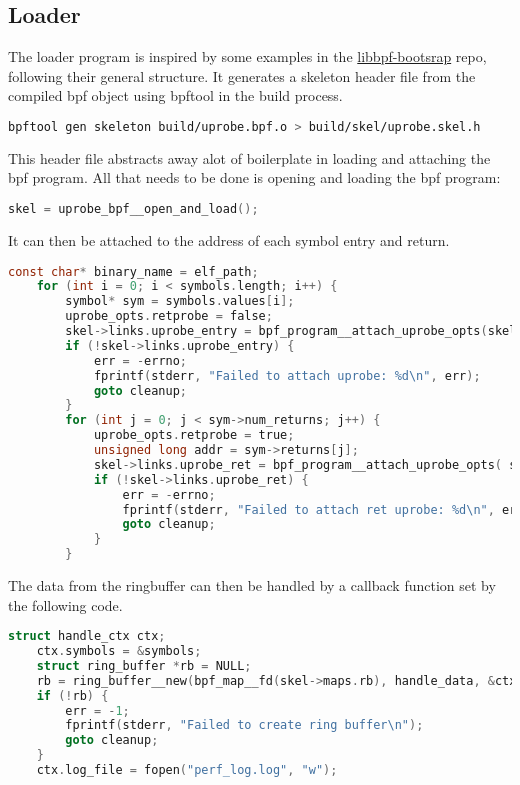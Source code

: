 \documentclass[a4paper, 12pt, english]{article}
\begin{document}
\subsection{Loader}
The loader program is inspired by some examples in the \href{https://github.com/libbpf/libbpf-bootstrap}{libbpf-bootsrap} repo, following their general structure.
It generates a skeleton header file from the compiled bpf object using bpftool in the build process.
\begin{lstlisting}[language=sh, basicstyle=\ttfamily, frame=single]
bpftool gen skeleton build/uprobe.bpf.o > build/skel/uprobe.skel.h
\end{lstlisting}

This header file abstracts away alot of boilerplate in loading and attaching the bpf program. All that needs to be done is opening and loading the bpf program:
\begin{lstlisting}[language=C, basicstyle=\ttfamily, frame=single]
    skel = uprobe_bpf__open_and_load();
\end{lstlisting}

It can then be attached to the address of each symbol entry and return.
\begin{lstlisting}[language=C, basicstyle=\ttfamily, frame=single]
    const char* binary_name = elf_path;
    for (int i = 0; i < symbols.length; i++) {
        symbol* sym = symbols.values[i];
        uprobe_opts.retprobe = false;
        skel->links.uprobe_entry = bpf_program__attach_uprobe_opts(skel->progs.uprobe_entry, -1, binary_name, sym->addr, &uprobe_opts);
        if (!skel->links.uprobe_entry) {
            err = -errno;
            fprintf(stderr, "Failed to attach uprobe: %d\n", err);
            goto cleanup;
        }
        for (int j = 0; j < sym->num_returns; j++) {
            uprobe_opts.retprobe = true;
            unsigned long addr = sym->returns[j];
            skel->links.uprobe_ret = bpf_program__attach_uprobe_opts( skel->progs.uprobe_ret, -1, binary_name, addr, &uprobe_opts);
            if (!skel->links.uprobe_ret) {
                err = -errno;
                fprintf(stderr, "Failed to attach ret uprobe: %d\n", err);
                goto cleanup;
            }
        }
\end{lstlisting}

The data from the ringbuffer can then be handled by a callback function set by the following code.
\begin{lstlisting}[language=C, basicstyle=\ttfamily, frame=single]
    struct handle_ctx ctx;
    ctx.symbols = &symbols;
    struct ring_buffer *rb = NULL;
    rb = ring_buffer__new(bpf_map__fd(skel->maps.rb), handle_data, &ctx, NULL);
    if (!rb) {
        err = -1;
        fprintf(stderr, "Failed to create ring buffer\n");
        goto cleanup;
    }
    ctx.log_file = fopen("perf_log.log", "w");
\end{lstlisting}
\end{document}

